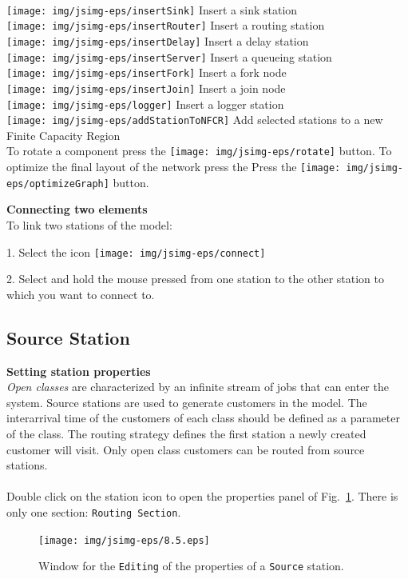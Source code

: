 \\
\texttt{[image: img/jsimg-eps/insertSink]} Insert a sink station\\
\texttt{[image: img/jsimg-eps/insertRouter]} Insert a routing
station\\
\texttt{[image: img/jsimg-eps/insertDelay]} Insert a delay station\\
\texttt{[image: img/jsimg-eps/insertServer]} Insert a queueing station\\
\texttt{[image: img/jsimg-eps/insertFork]} Insert a fork node\\
\texttt{[image: img/jsimg-eps/insertJoin]}  Insert a join node\\
\texttt{[image: img/jsimg-eps/logger]}  Insert a logger station\\
\texttt{[image: img/jsimg-eps/addStationToNFCR]}  Add selected stations to a new Finite Capacity
Region\\
To rotate a component press the
\texttt{[image: img/jsimg-eps/rotate]} button.
To optimize the final layout of the network press the Press the
\texttt{[image: img/jsimg-eps/optimizeGraph]} button.

\textbf{Connecting two elements}\\
To link two stations of the model:

1. Select the icon
\texttt{[image: img/jsimg-eps/connect]}

2. Select and hold the mouse pressed from one station to the other
station to which you want to connect to.


\subsection{Source Station}
\label{sstatlab} \textbf{Setting station properties}\\ \emph{Open
classes} are characterized by an infinite stream of jobs that can
enter the system. Source stations are used to generate customers
in the model. The interarrival time of the customers of each class
should be defined as a parameter of the class. The routing
strategy defines the first station a newly created customer will
visit. Only open class customers can be routed from source
stations.\\

\\ Double
click on the station icon to open the properties panel of
Fig.~\ref{fig:statprop}. There is only one section:
\texttt{Routing Section}.\\
\begin{figure}[htb]
    \begin{center}
        \texttt{[image: img/jsimg-eps/8.5.eps]}
    \end{center}
    \caption{Window for the \texttt{Editing} of the properties of a
    \texttt{Source} station.}
    \label{fig:statprop}
\end{figure}

